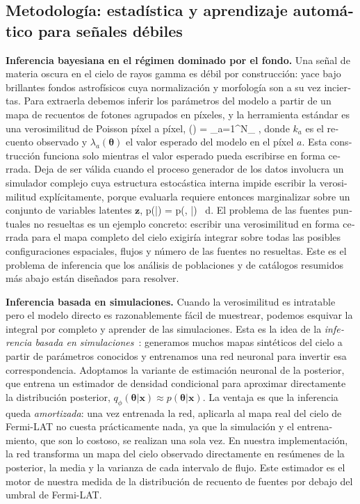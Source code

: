 \begin{otherlanguage}{spanish}
\section*{Metodología: estadística y aprendizaje automático para señales débiles}
\textbf{Inferencia bayesiana en el régimen dominado por el fondo.} Una señal de materia oscura en el cielo de rayos gamma es débil por construcción: yace bajo brillantes fondos astrofísicos cuya normalización y morfología son a su vez inciertas. Para extraerla debemos inferir los parámetros del modelo a partir de un mapa de recuentos de fotones agrupados en píxeles, y la herramienta estándar es una verosimilitud de Poisson píxel a píxel,
\be
{}(\boldsymbol{\theta}) = \prod_{a=1}^{N_{}} ,
\ee
donde $k_a$ es el recuento observado y $\lambda_a(\boldsymbol{\theta})$ el valor esperado del modelo en el píxel $a$. Esta construcción funciona solo mientras el valor esperado pueda escribirse en forma cerrada. Deja de ser válida cuando el proceso generador de los datos involucra un simulador complejo cuya estructura estocástica interna impide escribir la verosimilitud explícitamente, porque evaluarla requiere entonces marginalizar sobre un conjunto de variables latentes $\mathbf{z}$,
\be
p(|\boldsymbol{\theta}) = \int p(, |\boldsymbol{\theta}) \, d.
\ee
El problema de las fuentes puntuales no resueltas es un ejemplo concreto: escribir una verosimilitud en forma cerrada para el mapa completo del cielo exigiría integrar sobre todas las posibles configuraciones espaciales, flujos y número de las fuentes no resueltas. Este es el problema de inferencia que los análisis de poblaciones y de catálogos resumidos más abajo están diseñados para resolver.

\textbf{Inferencia basada en simulaciones.} Cuando la verosimilitud es intratable pero el modelo directo es razonablemente fácil de muestrear, podemos esquivar la integral por completo y aprender de las simulaciones. Esta es la idea de la \emph{inferencia basada en simulaciones}~\cite{Cranmer:2020}: generamos muchos mapas sintéticos del cielo a partir de parámetros conocidos y entrenamos una red neuronal para invertir esa correspondencia. Adoptamos la variante de estimación neuronal de la posterior, que entrena un estimador de densidad condicional para aproximar directamente la distribución posterior, $q_\phi(\boldsymbol{\theta}|\mathbf{x}) \approx p(\boldsymbol{\theta}|\mathbf{x})$. La ventaja es que la inferencia queda \emph{amortizada}: una vez entrenada la red, aplicarla al mapa real del cielo de Fermi-LAT no cuesta prácticamente nada, ya que la simulación y el entrenamiento, que son lo costoso, se realizan una sola vez. En nuestra implementación, la red transforma un mapa del cielo observado directamente en resúmenes de la posterior, la media y la varianza de cada intervalo de flujo. Este estimador es el motor de nuestra medida de la distribución de recuento de fuentes por debajo del umbral de Fermi-LAT.


\end{otherlanguage}

